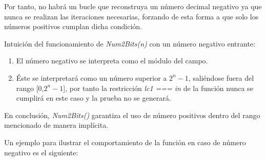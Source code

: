 \documentclass[a4paper,12pt]{report}
\begin{document}
	\vspace{0.2cm}
	\noindent Por tanto, no habrá un bucle que reconstruya un número decimal negativo ya que nunca se realizan las iteraciones necesarias, forzando de esta forma a que solo los números positivos cumplan dicha condición.
	
	\vspace{0.3cm}
	
	\noindent Intuición del funcionamiento de \textit{Num2Bits(n)} con un número negativo entrante:
	
	
	\begin{enumerate}
		\item El número negativo se interpreta como el módulo del campo.
		
		\item Éste se interpretará como un número superior a \(2^n - 1\), saliéndose fuera del rango [0,\(2^n-1\)], por tanto la restricción \textit{lc1 === in} de la función nunca se cumplirá en este caso y la prueba no se generará.
	\end{enumerate}
	
	\vspace{0.2cm}
	\noindent En conclusión, \textit{Num2Bits()} garantiza el uso de número positivos dentro del rango mencionado de manera implícita.
	
	
	\vspace{0.2cm}
	\noindent Un ejemplo para ilustrar el comportamiento de la función en caso de número negativo es el siguiente:
	
\end{document}
